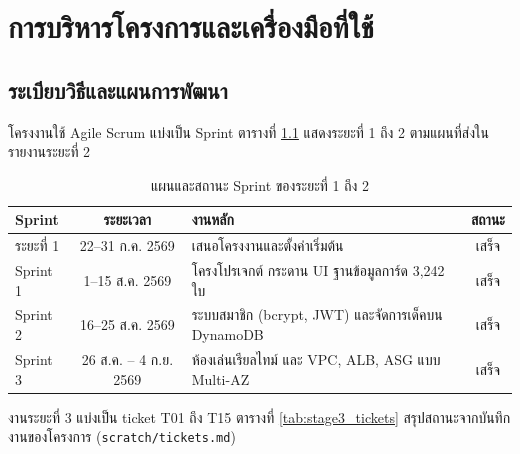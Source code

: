 \chapter{การบริหารโครงการและเครื่องมือที่ใช้}

\section{ระเบียบวิธีและแผนการพัฒนา}

โครงงานใช้ Agile Scrum แบ่งเป็น Sprint ตารางที่ \ref{tab:sprint_plan} แสดงระยะที่ 1 ถึง 2 ตามแผนที่ส่งในรายงานระยะที่ 2

\begin{table}[H]
\centering
\caption{แผนและสถานะ Sprint ของระยะที่ 1 ถึง 2}
\label{tab:sprint_plan}
\begin{tabularx}{\textwidth}{lcXc}
\toprule
\textbf{Sprint} & \textbf{ระยะเวลา} & \textbf{งานหลัก} & \textbf{สถานะ} \\
\midrule
ระยะที่ 1 & 22--31 ก.ค. 2569 & เสนอโครงงานและตั้งค่าเริ่มต้น & เสร็จ \\
Sprint 1 & 1--15 ส.ค. 2569 & โครงโปรเจกต์ กระดาน UI ฐานข้อมูลการ์ด 3,242 ใบ & เสร็จ \\
Sprint 2 & 16--25 ส.ค. 2569 & ระบบสมาชิก (bcrypt, JWT) และจัดการเด็คบน DynamoDB & เสร็จ \\
Sprint 3 & 26 ส.ค. -- 4 ก.ย. 2569 & ห้องเล่นเรียลไทม์ และ VPC, ALB, ASG แบบ Multi-AZ & เสร็จ \\
\bottomrule
\end{tabularx}
\end{table}

งานระยะที่ 3 แบ่งเป็น ticket T01 ถึง T15 ตารางที่ \ref{tab:stage3_tickets} สรุปสถานะจากบันทึกงานของโครงการ (\texttt{scratch/tickets.md}) 

